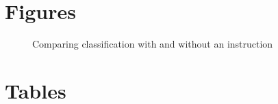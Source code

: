 \documentclass{bmcart}
\def\texttt{[image: ]}
\begin{document}
\begin{backmatter}




\section*{Figures}

\begin{figure}
\centering
\caption{\label{fig:comparison}Comparing classification with and without an instruction}
\end{figure}




\section*{Tables}


\begin{table}


\end{table}
\end{backmatter}
\end{document}
